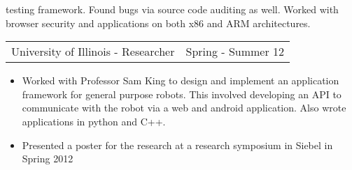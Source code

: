 \documentclass[margin]{res}
\begin{document}
\begin{resume}
\begin{itemize}
                      testing framework.  Found bugs via source code
                      auditing as well.  Worked with browser security
                      and applications on both x86 and ARM architectures.
		   \end{itemize}
		 \begin{tabular}{p{3in} r}
                  University of Illinois - Researcher &  Spring - Summer 12
                 \end{tabular}
		  \begin{itemize} \itemsep -2pt
                   \item Worked with Professor Sam King to design
                     and implement an application framework for
                     general purpose robots.  This involved developing
                     an API to communicate with the robot via a web
                     and android application.  Also wrote applications
                     in python and C++.
                   \item Presented a poster for
                     the research at a research symposium in Siebel in
                     Spring 2012
                  \end{itemize}


\end{resume}
\end{document}
